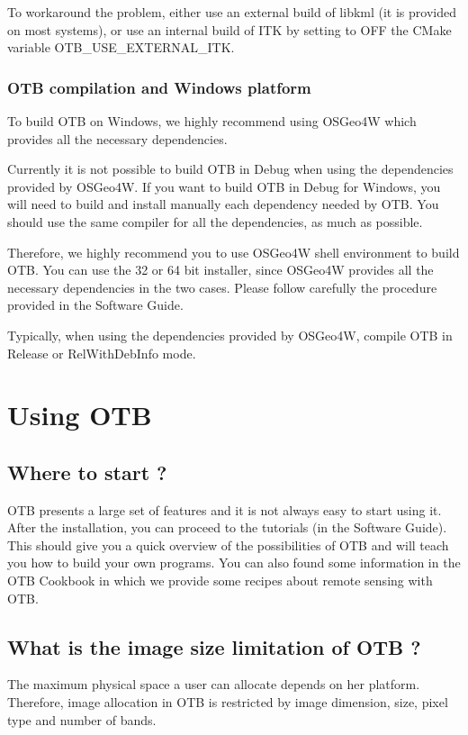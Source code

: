 To workaround the problem, either use an external build of libkml (it is provided on most systems), or use an internal build of ITK by setting to OFF the CMake variable OTB\_USE\_EXTERNAL\_ITK.

\subsubsection{OTB compilation and Windows platform}

To build OTB on Windows, we highly recommend using OSGeo4W which provides all the necessary dependencies.

Currently it is not possible to build OTB in Debug when using the dependencies provided by OSGeo4W.
If you want to build OTB in Debug for Windows, you will need to build and install manually each dependency needed by OTB.
You should use the same compiler for all the dependencies, as much as possible.

Therefore, we highly recommend you to use OSGeo4W shell environment to build OTB.
You can use the 32 or 64 bit installer, since OSGeo4W provides all the necessary dependencies in the two cases.
Please follow carefully the procedure provided in the Software Guide.

Typically, when using the dependencies provided by OSGeo4W, compile OTB in Release or RelWithDebInfo mode.
 
\section{Using OTB}

\subsection{Where to start ?}

OTB presents a large set of features and it is not always easy to start using it.
After the installation, you can proceed to the tutorials (in the Software Guide).
This should give you a quick overview of the possibilities of OTB and will teach
you how to build your own programs. You can also found some information in the OTB Cookbook in which we provide some recipes about remote sensing with OTB. 


\subsection{What is the image size limitation of OTB ?}

The maximum physical space a user can allocate depends on her platform. Therefore, image allocation in OTB is restricted by image dimension, size, pixel type and number of bands.

